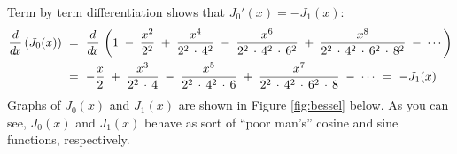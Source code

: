 Term by term differentiation shows that $J_0'(x) = -J_1(x)$:
\begin{align*}
\frac{d}{d\!x}\,(J_0(x)) ~&=~ \frac{d}{d\!x}\,\left(1 \;-\; \frac{x^2}{2^2} \;+\;
\frac{x^4}{2^2 \,\cdot\, 4^2} \;-\; \frac{x^6}{2^2 \,\cdot\, 4^2 \,\cdot\, 6^2} \;+\;
\frac{x^8}{2^2 \,\cdot\, 4^2 \,\cdot\, 6^2 \,\cdot\, 8^2} \;-\; \cdots\right)\\
&=~ -\frac{x}{2} \;+\; \frac{x^3}{2^2 \,\cdot\, 4} \;-\;
\frac{x^5}{2^2 \,\cdot\, 4^2 \,\cdot\, 6} \;+\;
\frac{x^7}{2^2 \,\cdot\, 4^2 \,\cdot\, 6^2 \,\cdot\, 8} \;-\; \cdots
~=~ -J_1(x)
\end{align*}
Graphs of $J_0(x)$ and $J_1(x)$ are shown in Figure \ref{fig:bessel} below.
As you can see, $J_0(x)$ and $J_1(x)$ behave as sort of ``poor man's'' cosine
and sine functions, respectively.\vspace{-2mm}

